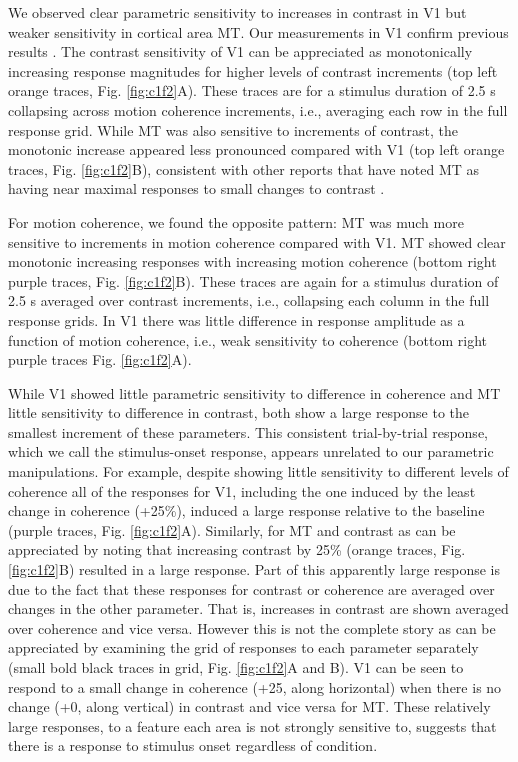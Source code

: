 \documentclass{report}
\begin{document}
We observed clear parametric sensitivity to increases in contrast in V1 but weaker sensitivity in cortical area MT. Our measurements in V1 confirm previous results \citep{Gardner2005-pg,Logothetis2001-kk,Tootell1995-gq,Tootell1998-mr}. The contrast sensitivity of V1 can be appreciated as monotonically increasing response magnitudes for higher levels of contrast increments (top left orange traces, Fig. \ref{fig:c1f2}A). These traces are for a stimulus duration of 2.5 s collapsing across motion coherence increments, i.e., averaging each row in the full response grid. While MT was also sensitive to increments of contrast, the monotonic increase appeared less pronounced compared with V1 (top left orange traces, Fig. \ref{fig:c1f2}B), consistent with other reports that have noted MT as having near maximal responses to small changes to contrast \citep{Sclar1990-lk,Tootell1995-gq}.

For motion coherence, we found the opposite pattern: MT was much more sensitive to increments in motion coherence compared with V1. MT showed clear monotonic increasing responses with increasing motion coherence (bottom right purple traces, Fig. \ref{fig:c1f2}B). These traces are again for a stimulus duration of 2.5 s averaged over contrast increments, i.e., collapsing each column in the full response grids. In V1 there was little difference in response amplitude as a function of motion coherence, i.e., weak sensitivity to coherence (bottom right purple traces Fig. \ref{fig:c1f2}A).

While V1 showed little parametric sensitivity to difference in coherence and MT little sensitivity to difference in contrast, both show a large response to the smallest increment of these parameters. This consistent trial-by-trial response, which we call the stimulus-onset response, appears unrelated to our parametric manipulations. For example, despite showing little sensitivity to different levels of coherence all of the responses for V1, including the one induced by the least change in coherence (+25\%), induced a large response relative to the baseline (purple traces, Fig. \ref{fig:c1f2}A). Similarly, for MT and contrast as can be appreciated by noting that increasing contrast by 25\% (orange traces, Fig. \ref{fig:c1f2}B) resulted in a large response. Part of this apparently large response is due to the fact that these responses for contrast or coherence are averaged over changes in the other parameter. That is, increases in contrast are shown averaged over coherence and vice versa. However this is not the complete story as can be appreciated by examining the grid of responses to each parameter separately (small bold black traces in grid, Fig. \ref{fig:c1f2}A and B). V1 can be seen to respond to a small change in coherence (+25, along horizontal) when there is no change (+0, along vertical) in contrast and vice versa for MT. These relatively large responses, to a feature each area is not strongly sensitive to, suggests that there is a response to stimulus onset regardless of condition.
\end{document}
